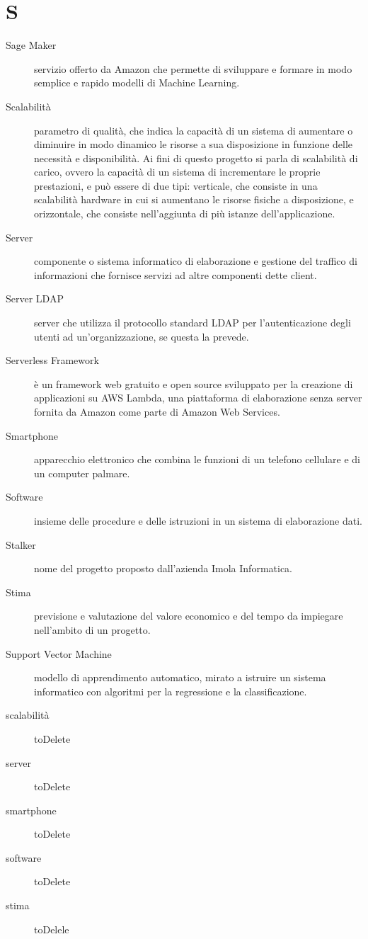 \documentclass{article}
\begin{document}
	\section{S}
	\begin{description}
		\item[Sage Maker] servizio offerto da Amazon che permette di sviluppare e formare in modo semplice e rapido modelli di Machine Learning.
		\item[Scalabilità] parametro di qualità, che indica la capacità di un sistema di aumentare o diminuire in modo dinamico le risorse a sua disposizione in funzione delle necessità e disponibilità. Ai fini di questo progetto si parla di scalabilità di carico, ovvero la capacità di un sistema di incrementare le proprie prestazioni, e può essere di due tipi: verticale, che consiste in una scalabilità hardware in cui si aumentano le risorse fisiche a disposizione, e orizzontale, che consiste nell’aggiunta di più istanze dell’applicazione.
		\item[Server] componente o sistema informatico di elaborazione e gestione del traffico di informazioni che fornisce servizi ad altre componenti dette client.
		\item[Server LDAP] server che utilizza il protocollo standard LDAP per l'autenticazione degli utenti ad un'organizzazione, se questa la prevede.
		\item[Serverless Framework] è un framework web gratuito e open source sviluppato per la creazione di applicazioni su AWS Lambda, una piattaforma di elaborazione senza server fornita da Amazon come parte di Amazon Web Services.
		\item[Smartphone] apparecchio elettronico che combina le funzioni di un telefono cellulare e di un computer palmare.
		\item[Software] insieme delle procedure e delle istruzioni in un sistema di elaborazione dati.
		\item[Stalker] nome del progetto proposto dall'azienda Imola Informatica.
		\item[Stima] previsione e valutazione del valore economico e del tempo da impiegare nell'ambito di un progetto.
		\item[Support Vector Machine] modello di apprendimento automatico, mirato a istruire un sistema informatico con algoritmi per la regressione e la classificazione.
		\item[scalabilità] toDelete
		\item[server] toDelete
		\item[smartphone] toDelete
		\item[software] toDelete
		\item[stima] toDelele
	\end{description}
\end{document}
